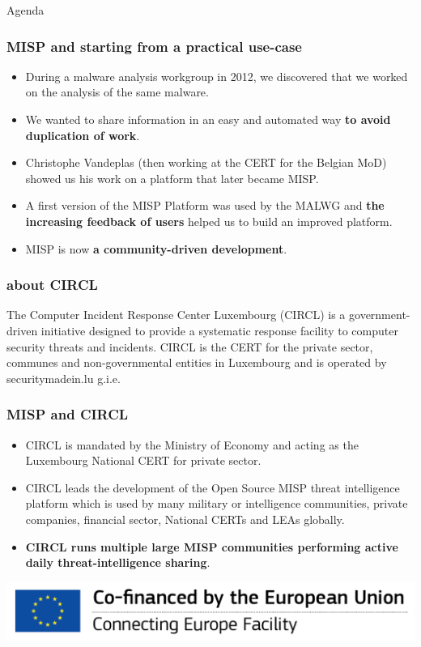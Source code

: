 
\begin{frame}[t,plain]
\titlepage
\end{frame}

\begin{frame}{Agenda}
    
\end{frame}

\begin{frame}
 \frametitle{MISP and starting from a practical use-case}
 \begin{itemize}
         \item During a malware analysis workgroup in 2012, we discovered that we worked on the analysis of the same malware.
         \item We wanted to share information in an easy and automated way {\bf to avoid duplication of work}.
         \item Christophe Vandeplas (then working at the CERT for the Belgian MoD) showed us his work on a platform that later became MISP.
         \item A first version of the MISP Platform was used by the MALWG and {\bf the increasing feedback of users} helped us to build an improved platform.
         \item MISP is now {\bf a community-driven development}.
 \end{itemize}
\end{frame}

\begin{frame}
\frametitle{about CIRCL}
The Computer Incident Response Center Luxembourg (CIRCL) is a government-driven initiative designed to provide a systematic response facility to computer security threats and incidents. CIRCL is the CERT for the private sector, communes and non-governmental entities in Luxembourg and is operated by securitymadein.lu g.i.e.
\end{frame}

\begin{frame}
\frametitle{MISP and CIRCL}
\begin{itemize}
\item CIRCL is mandated by the Ministry of Economy and acting as the Luxembourg National CERT for private sector.
\item CIRCL leads the development of the Open Source MISP threat intelligence platform which is used by many military or intelligence communities, private companies, financial sector, National CERTs and LEAs globally.
\item {\bf CIRCL runs multiple large MISP communities performing active daily threat-intelligence sharing}.
\end{itemize}
        \includegraphics{en_cef.png}
\end{frame}


